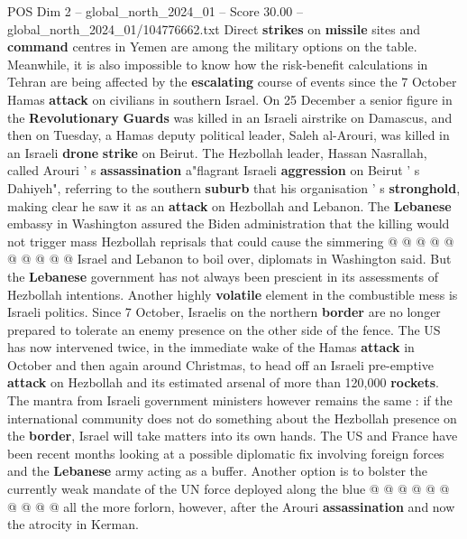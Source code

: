 \begin{textsample}{POS Dim 2 – global\_north\_2024\_01 – Score 30.00 – global\_north\_2024\_01/104776662.txt}
Direct \textbf{strikes} on \textbf{missile} sites and \textbf{command} centres in Yemen are among the military options on the table.
Meanwhile, it is also impossible to know how the risk-benefit calculations in Tehran are being affected by the \textbf{escalating} course of events since the 7 October Hamas \textbf{attack} on civilians in southern Israel.
On 25 December a senior figure in the \textbf{Revolutionary} \textbf{Guards} was killed in an Israeli airstrike on Damascus, and then on Tuesday, a Hamas deputy political leader, Saleh al-Arouri, was killed in an Israeli \textbf{drone} \textbf{strike} on Beirut.
The Hezbollah leader, Hassan Nasrallah, called Arouri ' s \textbf{assassination} a"flagrant Israeli \textbf{aggression} on Beirut ' s Dahiyeh", referring to the southern \textbf{suburb} that his organisation ' s \textbf{stronghold}, making clear he saw it as an \textbf{attack} on Hezbollah and Lebanon.
The \textbf{Lebanese} embassy in Washington assured the Biden administration that the killing would not trigger mass Hezbollah reprisals that could cause the simmering @ @ @ @ @ @ @ @ @ @ Israel and Lebanon to boil over, diplomats in Washington said.
But the \textbf{Lebanese} government has not always been prescient in its assessments of Hezbollah intentions.
Another highly \textbf{volatile} element in the combustible mess is Israeli politics.
Since 7 October, Israelis on the northern \textbf{border} are no longer prepared to tolerate an enemy presence on the other side of the fence.
The US has now intervened twice, in the immediate wake of the Hamas \textbf{attack} in October and then again around Christmas, to head off an Israeli pre-emptive \textbf{attack} on Hezbollah and its estimated arsenal of more than 120,000 \textbf{rockets}.
The mantra from Israeli government ministers however remains the same : if the international community does not do something about the Hezbollah presence on the \textbf{border}, Israel will take matters into its own hands.
The US and France have been recent months looking at a possible diplomatic fix involving foreign forces and the \textbf{Lebanese} army acting as a buffer.
Another option is to bolster the currently weak mandate of the UN force deployed along the blue @ @ @ @ @ @ @ @ @ @ all the more forlorn, however, after the Arouri \textbf{assassination} and now the atrocity in Kerman.

\end{textsample}
